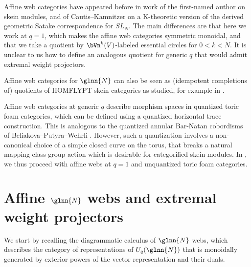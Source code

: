 \begin{rema} Affine web categories have appeared before in work of the
first-named author \cite{Queff_aff} on skein modules, and of Cautis--Kamnitzer
\cite{CK_ann} on a K-theoretic version of the derived geometric Satake
correspondence for $SL_N$. The main differences are that here we work at $q=1$,
which makes the affine web categories symmetric monoidal, and that we take a
quotient by $\bVn^k(V)$-labeled essential circles for $0<k<N$. It is unclear to
us how to define an analogous quotient for generic $q$ that would admit extremal
weight projectors.

Affine web categories for $\glnn{N}$ can also be seen as (idempotent completions
of) quotients of HOMFLYPT skein categories as studied, for example in
\cite[Section 4]{Bru}.
\end{rema}
\begin{rema}
\label{rem:q}
Affine web categories at generic $q$ describe morphism spaces in quantized toric
foam categories, which can be defined using a quantized horizontal trace
construction. This is analogous to the quantized annular Bar-Natan cobordisms of
Beliakova--Putyra--Wehrli \cite{BPW}. However, such a quantization involves a
non-canonical choice of a simple closed curve on the torus, that breaks a
natural mapping class group action which is desirable for categorified skein
modules. In \cite{QW3}, we thus proceed with affine webs at $q=1$ and
unquantized toric foam categories.
\end{rema}





\section{Affine \texorpdfstring{$\glnn{N}$}{gl(N)} webs and extremal weight projectors}
We start by recalling the diagrammatic calculus of $\glnn{N}$ webs, which describes the category of representations of $U_q(\glnn{N})$ that is monoidally generated by exterior powers of the vector representation and their duals. 
